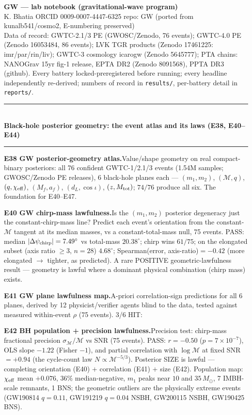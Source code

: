 \documentclass[10pt]{article}
\newcommand{\entry}[2]{\vspace{5pt}\noindent\textbf{#1}\quad #2\par}
\newcommand{\grouphead}[1]{\vspace{9pt}\noindent\rule{\linewidth}{0.4pt}\\[-2pt]{\small\textbf{#1}}\\[-4pt]\rule{\linewidth}{0.4pt}\par\vspace{2pt}}
\begin{document}
{\large\textbf{GW --- lab notebook (gravitational-wave program)}}\\
K. Bhatia \quad ORCID 0009-0007-4447-6325 \quad repo: GW (ported from kunalb541/cosmo2, E-numbering preserved)\\
Data of record: GWTC-2.1/3 PE (GWOSC/Zenodo, 76 events); GWTC-4.0 PE (Zenodo 16053484, 86 events);
LVK TGR products (Zenodo 17461225: imr/par/rin/liv); GWTC-3 cosmology icarogw (Zenodo 5645777);
PTA chains: NANOGrav 15yr fig-1 release, EPTA DR2 (Zenodo 8091568), PPTA DR3 (github).
Every battery locked-preregistered before running; every headline independently re-derived;
numbers of record in \texttt{results/}, per-battery detail in \texttt{reports/}.

\grouphead{Black-hole posterior geometry: the event atlas and its laws (E38, E40--E44)}

\entry{E38 GW posterior-geometry atlas.}{Value/shape geometry on real compact-binary posteriors:
all 76 confident GWTC-1/2.1/3 events (1.54M samples; GWOSC/Zenodo PE releases), 6 black-hole planes
each --- $(m_1,m_2)$, $(\mathcal{M},q)$, $(q,\chi_{\rm eff})$, $(M_f,a_f)$, $(d_L,\cos\iota)$,
$(z,M_{\rm tot})$; $74/76$ produce all six. The foundation for E40--E47.}

\entry{E40 GW chirp-mass lawfulness.}{Is the $(m_1,m_2)$ posterior degeneracy just the
constant-chirp-mass line? Predict each event's orientation from the constant-$\mathcal{M}$ tangent
at its median masses, vs a constant-total-mass null, 75 events. PASS: median $|\Delta\psi_{\rm
chirp}|=7.49^\circ$ vs total-mass $20.38^\circ$; chirp wins $61/75$; on the elongated subset
(axis ratio $\ge3$, $n{=}28$) $4.68^\circ$; Spearman(error, axis-ratio)$=-0.42$ (more elongated
$\to$ tighter, as predicted). A rare POSITIVE geometric-lawfulness result --- geometry is lawful
where a dominant physical combination (chirp mass) exists.}

\entry{E41 GW plane lawfulness map.}{A-priori correlation-sign predictions for all 6 planes,
derived by 12 physicist/verifier agents blind to the data, tested against measured within-event
$\rho$ (75 events). 3/6 HIT:}

\entry{E42 BH population + precision lawfulness.}{Precision test: chirp-mass fractional precision
$\sigma_{\mathcal M}/\mathcal M$ vs SNR (75 events). PASS: $r=-0.50$ ($p{=}7{\times}10^{-7}$), OLS
slope $-1.22$ (Fisher $-1$), and partial correlation with $\log\mathcal M$ at fixed SNR $=+0.94$
(the cycle-count law $N\propto\mathcal{M}^{-5/3}$). Posterior SIZE is lawful --- completing
orientation (E40) $+$ correlation (E41) $+$ size (E42). Population map: $\chi_{\rm eff}$ mean
$+0.076$, $36\%$ median-negative, $m_1$ peaks near $10$ and $35\,M_\odot$, 7 IMBH-scale remnants,
1 BNS; the geometric outliers are the physically extreme events (GW190814 $q{=}0.11$, GW191219
$q{=}0.04$ NSBH, GW200115 NSBH, GW190425 BNS).}
\end{document}
